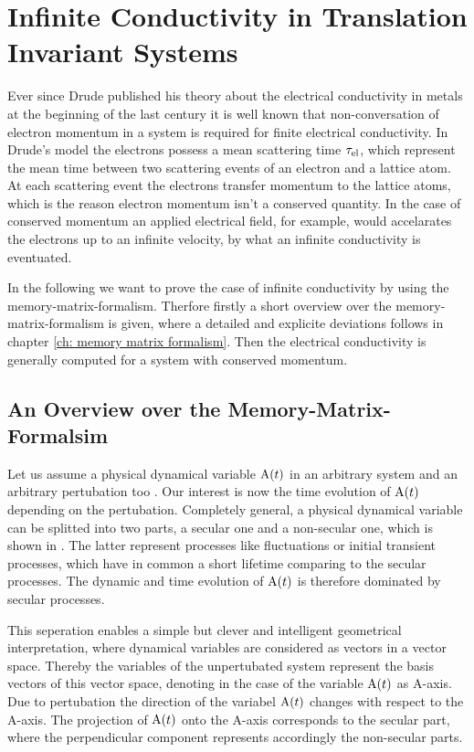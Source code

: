 %
%
%
\chapter{Infinite Conductivity in Translation Invariant Systems}
\label{ch:infinite conductivity}
%
%
%
Ever since Drude published his theory about the electrical conductivity in metals \cite{Drude} at the beginning of the last century it is well known that non-conversation of electron momentum in a system is required for finite electrical conductivity.
In Drude's model the electrons possess a mean scattering time $\tau_{\mathrm{el}}$, which represent the mean time between two scattering events of an electron and a lattice atom.
At each scattering event the electrons transfer momentum to the lattice atoms, which is the reason electron momentum isn't a conserved quantity.
In the case of conserved momentum an applied electrical field, for example, would accelarates the electrons up to an infinite velocity, by what an infinite conductivity is eventuated.

In the following we want to prove the case of infinite conductivity by using the memory-matrix-formalism.
Therfore firstly a short overview over the memory-matrix-formalism is given, where a detailed and explicite deviations follows in chapter \ref{ch: memory matrix formalism}.
Then the electrical conductivity is generally computed for a system with conserved momentum.
%
%
\section{An Overview over the Memory-Matrix-Formalsim}
\label{sec:overview MMF}
%
%
Let us assume a physical dynamical variable $\mathrm{A}(t)$ in an arbitrary system and an arbitrary pertubation too	.
Our interest is now the time evolution of $\mathrm{A}(t)$ depending on the pertubation.
Completely general, a physical dynamical variable can be splitted into two parts, a secular one and a non-secular one, which is shown in \cite{Mori}.
The latter represent processes like fluctuations or initial transient processes, which have in common a short lifetime comparing to the secular processes.
The dynamic and time evolution of $\mathrm{A}(t)$ is therefore dominated by secular processes.

This seperation enables a simple but clever and intelligent geometrical interpretation, where dynamical variables are considered as vectors in a vector space.
Thereby the variables of the unpertubated system represent the basis vectors of this vector space, denoting in the case of the variable $\mathrm{A}(t)$ as A-axis.
Due to pertubation the direction of the variabel $\mathrm{A}(t)$ changes with respect to the A-axis.
The projection of $\mathrm{A}(t)$ onto the A-axis corresponds to the secular part, where the perpendicular component represents accordingly the non-secular parts.

